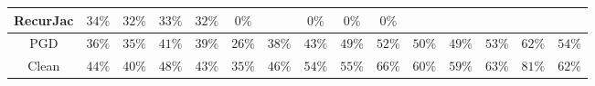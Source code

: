 \begin{table*}
{\begin{tabular}{c|c|c|c|c|c|c|c|c|c|c|c|c|c|c}
     RecurJac &        $34\%$ &        $32\%$ &        $33\%$ &        $32\%$ &         $0\%$ &               &         $0\%$ &         $0\%$ &         $0\%$ &               &               &               &               &               \\
\hline
          PGD &        $36\%$ &        $35\%$ &        $41\%$ &        $39\%$ &        $26\%$ &        $38\%$ &        $43\%$ &        $49\%$ &        $52\%$ &        $50\%$ &        $49\%$ &        $53\%$ &        $62\%$ &        $54\%$ \\
\hline
        Clean &        $44\%$ &        $40\%$ &        $48\%$ &        $43\%$ &        $35\%$ &        $46\%$ &        $54\%$ &        $55\%$ &        $66\%$ &        $60\%$ &        $59\%$ &        $63\%$ &        $81\%$ &        $62\%$ \\

    \bottomrule
    \end{tabular}
    }
    \label{table:exp-A-robust-accuracy-cifar10-2}
\end{table*}
    

